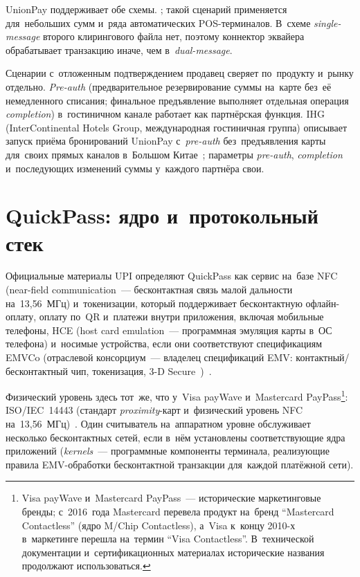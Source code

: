 UnionPay поддерживает обе схемы. ; такой сценарий применяется для~небольших сумм
и~ряда автоматических POS-терминалов. В~схеме \textit{single-message} второго
клирингового файла нет, поэтому коннектор эквайера обрабатывает транзакцию иначе, чем
в~\textit{dual-message}.

Сценарии с~отложенным подтверждением продавец сверяет по~продукту и~рынку
отдельно. \textit{Pre-auth} (предварительное резервирование суммы на~карте
  без~её немедленного списания; финальное предъявление выполняет отдельная
операция \textit{completion}) в~гостиничном канале работает как партнёрская
функция. IHG (InterContinental Hotels Group, международная гостиничная
группа) описывает запуск приёма бронирований UnionPay с~\textit{pre-auth}
без~предъявления карты для~своих прямых каналов в~Большом
Китае~\cite{ihg-unionpay-preauth-2024}; параметры \textit{pre-auth},
\textit{completion} и~последующих изменений суммы у~каждого партнёра свои.

\section{QuickPass: ядро и~протокольный стек}\label{sec:up-quickpass}

Официальные материалы UPI определяют QuickPass как сервис на~базе NFC
(near-field communication~--- бесконтактная связь малой дальности
на~13{,}56~МГц) и~токенизации, который поддерживает бесконтактную
офлайн-оплату, оплату по~QR и~платежи внутри приложения, включая мобильные
телефоны, HCE (host card emulation~--- программная эмуляция карты в~ОС
телефона) и~носимые устройства, если они соответствуют спецификациям
EMVCo (отраслевой консорциум~--- владелец спецификаций EMV: контактный/бесконтактный
чип, токенизация, 3-D Secure~\cite{emvco-specs})~\cite{unionpay-quickpass-overview}.

Физический уровень здесь тот~же, что у~Visa payWave и~Mastercard
PayPass\footnote{Visa payWave и~Mastercard PayPass~--- исторические
  маркетинговые бренды; с~2016~года Mastercard перевела продукт на~бренд
  \enquote{Mastercard Contactless} (ядро M/Chip Contactless), а~Visa к~концу
  2010-х в~маркетинге перешла на~термин \enquote{Visa Contactless}. В~технической
  документации и~сертификационных материалах исторические названия продолжают
использоваться.}: ISO/IEC~14443 (стандарт \textit{proximity}-карт и~физический
уровень NFC на~13{,}56~МГц)~\cite{iso-14443-1}. Один считыватель на~аппаратном
уровне обслуживает несколько бесконтактных сетей, если в~нём установлены
соответствующие ядра приложений (\textit{kernels}~--- программные компоненты терминала,
  реализующие правила EMV-обработки бесконтактной транзакции для~каждой
платёжной сети).

